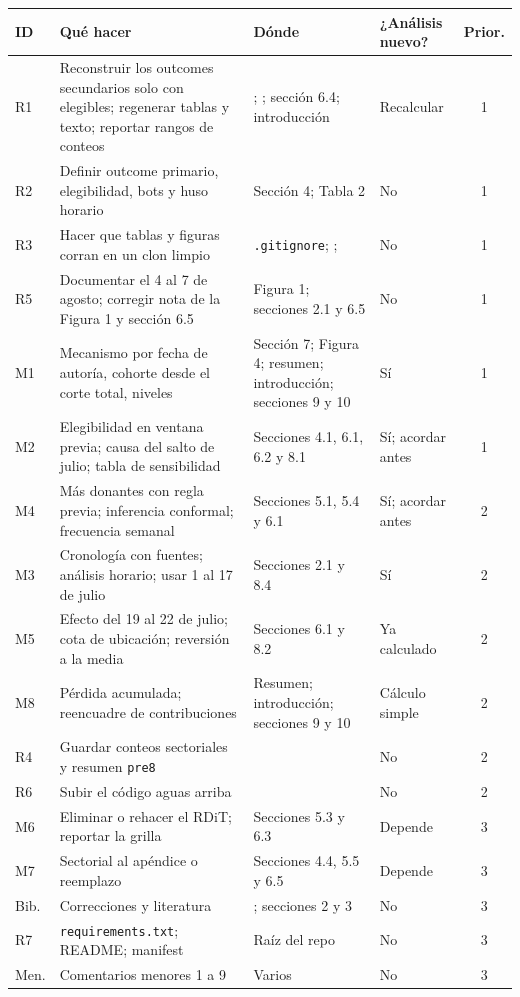 \documentclass[11pt,a4paper]{article}
\renewcommand{\arraystretch}{1.12}
\newcommand{\cod}[1]{\texttt{#1}}
\begin{document}
{\small\renewcommand{\arraystretch}{1.35}
\begin{longtable}{@{}L{0.9cm}L{5.6cm}L{4.7cm}L{2.0cm}c@{}}
\toprule
ID & Qué hacer & Dónde & ¿Análisis nuevo? & Prior. \\
\midrule
\endhead
R1 & Reconstruir los outcomes secundarios solo con elegibles; regenerar tablas y texto; reportar rangos de conteos &
  ; ; sección 6.4; introducción & Recalcular & 1 \\
R2 & Definir outcome primario, elegibilidad, bots y huso horario & Sección 4; Tabla 2 & No & 1 \\
R3 & Hacer que tablas y figuras corran en un clon limpio & \cod{.gitignore}; ;  & No & 1 \\
R5 & Documentar el 4 al 7 de agosto; corregir nota de la Figura 1 y sección 6.5 & Figura 1; secciones 2.1 y 6.5 & No & 1 \\
M1 & Mecanismo por fecha de autoría, cohorte desde el corte total, niveles & Sección 7; Figura 4; resumen; introducción; secciones 9 y 10 & Sí & 1 \\
M2 & Elegibilidad en ventana previa; causa del salto de julio; tabla de sensibilidad & Secciones 4.1, 6.1, 6.2 y 8.1 & Sí; acordar antes & 1 \\
M4 & Más donantes con regla previa; inferencia conformal; frecuencia semanal & Secciones 5.1, 5.4 y 6.1 & Sí; acordar antes & 2 \\
M3 & Cronología con fuentes; análisis horario; usar 1 al 17 de julio & Secciones 2.1 y 8.4 & Sí & 2 \\
M5 & Efecto del 19 al 22 de julio; cota de ubicación; reversión a la media & Secciones 6.1 y 8.2 & Ya calculado & 2 \\
M8 & Pérdida acumulada; reencuadre de contribuciones & Resumen; introducción; secciones 9 y 10 & Cálculo simple & 2 \\
R4 & Guardar conteos sectoriales y resumen \cod{pre8} &  & No & 2 \\
R6 & Subir el código aguas arriba &  & No & 2 \\
M6 & Eliminar o rehacer el RDiT; reportar la grilla & Secciones 5.3 y 6.3 & Depende & 3 \\
M7 & Sectorial al apéndice o reemplazo & Secciones 4.4, 5.5 y 6.5 & Depende & 3 \\
Bib. & Correcciones y literatura & ; secciones 2 y 3 & No & 3 \\
R7 & \cod{requirements.txt}; README; manifest & Raíz del repo & No & 3 \\
Men. & Comentarios menores 1 a 9 & Varios & No & 3 \\
\bottomrule
\end{longtable}
}
\end{document}
